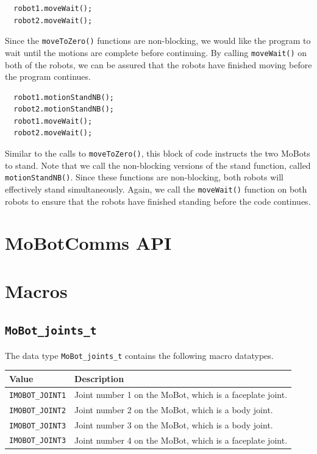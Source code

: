 \documentclass{article}
\begin{document}
\begin{verbatim}
  robot1.moveWait();
  robot2.moveWait();
\end{verbatim}
Since the \texttt{moveToZero()} functions are non-blocking, we would like
the program to wait until the motions are complete before continuing. By
calling \texttt{moveWait()} on both of the robots, we can be assured that
the robots have finished moving before the program continues.

\begin{verbatim}
  robot1.motionStandNB();
  robot2.motionStandNB();
  robot1.moveWait();
  robot2.moveWait();
\end{verbatim}
Similar to the calls to \texttt{moveToZero()}, this block of code instructs 
the two MoBots to stand. Note that we call the non-blocking versions of the
stand function, called \texttt{motionStandNB()}. Since these functions are
non-blocking, both robots will effectively stand simultaneously. Again,
we call the \texttt{moveWait()} function on both robots to ensure that 
the robots have finished standing before the code continues.

\newpage
\appendix
\section{MoBotComms API}


\section{Macros}

\subsection{\texttt{MoBot\_joints\_t}}
The data type \texttt{MoBot\_joints\_t} contains the following macro datatypes.\\

\begin{tabular}{p{3cm}p{7cm}} \hline 
Value & Description \\
\hline 
\texttt{IMOBOT\_JOINT1} & Joint number 1 on the MoBot, which is a faceplate joint. \\
\texttt{IMOBOT\_JOINT2} & Joint number 2 on the MoBot, which is a body joint. \\
\texttt{IMOBOT\_JOINT3} & Joint number 3 on the MoBot, which is a body joint. \\
\texttt{IMOBOT\_JOINT3} & Joint number 4 on the MoBot, which is a faceplate joint. 
\end{tabular}
\end{document}
